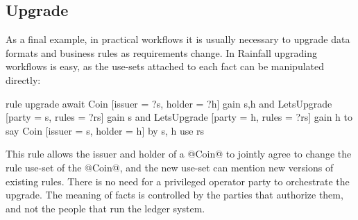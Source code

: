 \subsection{Upgrade}
\label{s:Upgrade}
As a final example, in practical workflows it is usually necessary to upgrade data formats and business rules as requirements change. In Rainfall upgrading workflows is easy, as the use-sets attached to each fact can be manipulated directly:

\begin{small}
\begin{code}
  rule   upgrade
  await  Coin [issuer = ?s, holder = ?h]      gain {s,h}
     and LetsUpgrade [party = s, rules = ?rs] gain {s}
     and LetsUpgrade [party = h, rules = ?rs] gain {h}
  to say Coin [issuer = s, holder = h]
      by {s, h} use rs
\end{code}
\end{small}

This rule allows the issuer and holder of a @Coin@ to jointly agree to change the rule use-set of the @Coin@, and the new use-set can mention new versions of existing rules. There is no need for a privileged operator party to orchestrate the upgrade. The meaning of facts is controlled by the parties that authorize them, and not the people that run the ledger system.

